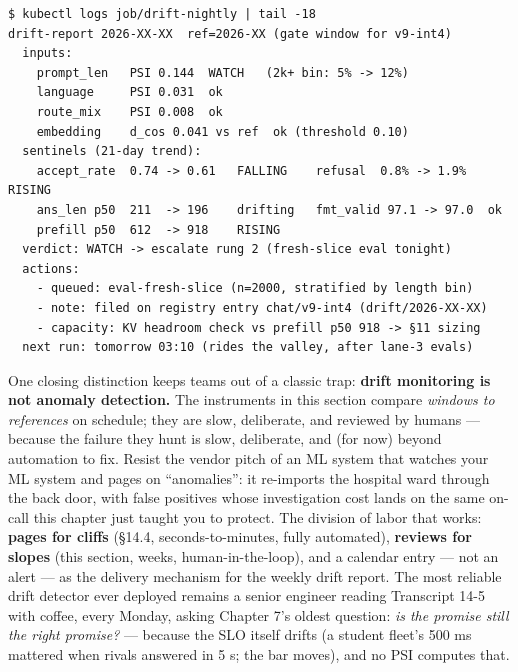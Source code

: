 \begin{terminalbox}
\begin{Verbatim}[breaklines=true,breakanywhere=true,fontsize=\small,formatcom=\color{tbbtermfg},codes=\tbbcodeactive]
$ kubectl logs job/drift-nightly | tail -18
drift-report 2026-XX-XX  ref=2026-XX (gate window for v9-int4)
  inputs:
    prompt_len   PSI 0.144  WATCH   (2k+ bin: 5% -> 12%)
    language     PSI 0.031  ok
    route_mix    PSI 0.008  ok
    embedding    d_cos 0.041 vs ref  ok (threshold 0.10)
  sentinels (21-day trend):
    accept_rate  0.74 -> 0.61   FALLING    refusal  0.8% -> 1.9%  RISING
    ans_len p50  211  -> 196    drifting   fmt_valid 97.1 -> 97.0  ok
    prefill p50  612  -> 918    RISING
  verdict: WATCH -> escalate rung 2 (fresh-slice eval tonight)
  actions:
    - queued: eval-fresh-slice (n=2000, stratified by length bin)
    - note: filed on registry entry chat/v9-int4 (drift/2026-XX-XX)
    - capacity: KV headroom check vs prefill p50 918 -> §11 sizing
  next run: tomorrow 03:10 (rides the valley, after lane-3 evals)
\end{Verbatim}
\end{terminalbox}

One closing distinction keeps teams out of a classic trap: \textbf{drift monitoring is not anomaly detection.} The instruments in this section compare \textit{windows to references} on schedule; they are slow, deliberate, and reviewed by humans — because the failure they hunt is slow, deliberate, and (for now) beyond automation to fix. Resist the vendor pitch of an ML system that watches your ML system and pages on “anomalies”: it re-imports the hospital ward through the back door, with false positives whose investigation cost lands on the same on-call this chapter just taught you to protect. The division of labor that works: \textbf{pages for cliffs} (§14.4, seconds-to-minutes, fully automated), \textbf{reviews for slopes} (this section, weeks, human-in-the-loop), and a calendar entry — not an alert — as the delivery mechanism for the weekly drift report. The most reliable drift detector ever deployed remains a senior engineer reading Transcript 14-5 with coffee, every Monday, asking Chapter 7’s oldest question: \textit{is the promise still the right promise?} — because the SLO itself drifts (a student fleet’s 500 ms mattered when rivals answered in 5 s; the bar moves), and no PSI computes that.

